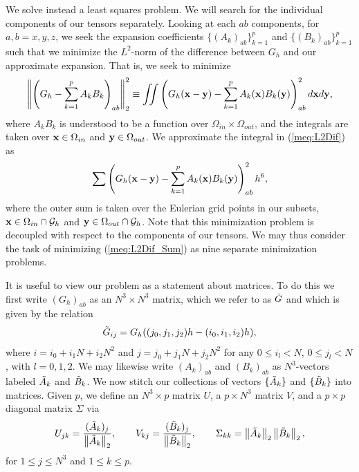 We solve instead a least squares problem. We will search for the individual components of our tensors separately. Looking at each $ab$ components, for $a,b=x,y,z$, we seek the expansion coefficients $\{(A_k)_{ab}\}_{k=1}^p$ and $\{(B_k)_{ab}\}_{k=1}^p$ such that we minimize the $L^2$-norm of the difference between $G_h$ and our approximate expansion. That is, we seek to minimize
\begin{equation}
\left\lVert\left(G_h - \sum_{k = 1}^p A_k B_k\right)_{ab}\right\rVert^2_2 \equiv
\iint
\left(G_h(\mathbf{x} - \mathbf{y}) - \sum_{k = 1}^p A_k(\mathbf{x}) B_k(\mathbf{y})\right)_{ab}^2
d\mathbf{x} d\mathbf{y},
\label{meq:L2Dif}
\end{equation}
where $A_k B_k$ is understood to be a function over $\Omega_{in}\times\Omega_{out}$, and the integrals are taken over $\mathbf{x}\in\Omega_{in}$ and $\mathbf{y}\in\Omega_{out}$. We approximate the integral in (\ref{meq:L2Dif}) as
\begin{equation}
\sum
\left(G_h(\mathbf{x} - \mathbf{y}) - \sum_{k = 1}^p A_k(\mathbf{x}) B_k(\mathbf{y})\right)_{ab}^2 h^6,
\label{meq:L2Dif_Sum}
\end{equation}
where the outer sum is taken over the Eulerian grid points in our subsets, $\mathbf{x}\in\Omega_{in}\cap\mathcal{G}_h$ and $\mathbf{y}\in\Omega_{out}\cap\mathcal{G}_h$.
Note that this minimization problem is decoupled with respect to the components of our tensors. We may thus consider the task of minimizing (\ref{meq:L2Dif_Sum}) as nine separate minimization problems.

It is useful to view our problem as a statement about matrices. To do this we first write $(G_h)_{ab}$ as an $N^3\times N^3$ matrix, which we refer to as $\tilde{G}$ and which is given by the relation
\begin{equation}
\tilde{G}_{ij} = G_h((j_0,j_1,j_2)h-(i_0,i_1,i_2)h),
\end{equation}
where $i = i_0 + i_1N + i_2N^2$ and $j = j_0 + j_1N + j_2N^2$ for any $0\leq i_l < N$, $0\leq j_l < N$, with $l=0,1,2$. We may likewise write $(A_k)_{ab}$ and $(B_k)_{ab}$ as $N^3$-vectors labeled $\tilde{A}_k$ and $\tilde{B}_k$.
We now stitch our collections of vectors $\{\tilde{A}_k\}$ and $\{\tilde{B}_k\}$ into matrices. Given $p$, we define an $N^3\times p$ matrix $U$, a $p\times N^3$ matrix $V$, and a $p\times p$ diagonal matrix $\Sigma$ via
\begin{equation}
U_{jk} = \frac{(\tilde{A}_k)_j}{\left\lVert\tilde{A}_k\right\rVert_2},
\qquad
V_{kj} = \frac{(\tilde{B}_k)_j}{\left\lVert\tilde{B}_k\right\rVert_2},
\qquad
\Sigma_{kk} = \left\lVert\tilde{A}_k\right\rVert_2 \left\lVert\tilde{B}_k\right\rVert_2,
\end{equation}
for $1\leq j\leq N^3$ and $1\leq k\leq p$.

